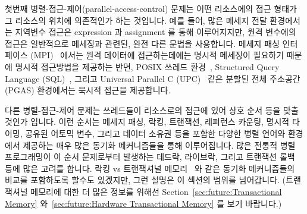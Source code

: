 첫번째 병렬-접근-제어(parallel-access-control) 문제는 어떤 리소스에의 접근
형태가 그 리소스의 위치에 의존적인가 하는 것입니다.
예를 들어, 많은 메세지 전달 환경에서는 지역변수 접근은 expression 과 assignment
를 통해 이루어지지만, 원격 변수에의 접근은 일반적으로 메세징과 관련된, 완전
다른 문법을 사용합니다.
메세지 패싱 인터페이스 (MPI)~\cite{MPIForum2008} 에서는 원격 데이터에
접근하는데에는 명시적 메세징이 필요하기 때문에 명시적 접근방법을 제공하는 반면,
POSIX 쓰레드 환경~\cite{OpenGroup1997pthreads}, Structured Query Language
(SQL)~\cite{DIS9075SQL92}, 그리고 Universal Parallel C
(UPC)~\cite{ElGhazawi2003UPC} 같은 분할된 전체 주소공간(PGAS) 환경에서는 묵시적
접근을 제공합니다.

다른 병렬-접근-제어 문제는 쓰레드들이 리소스로의 접근에 있어 상호 순서 등을
맞출 것인가 입니다.
이런 순서는 메세지 패싱, 락킹, 트랜잭션, 레퍼런스 카운팅, 명시적 타이밍, 공유된
어토믹 변수, 그리고 데이터 소유권 등을 포함한 다양한 병렬 언어와 환경에서
제공하는 매우 많은 동기화 메커니즘들을 통해 이루어집니다.
많은 전통적 병렬 프로그래밍이 이 순서 문제로부터 발생하는 데드락, 라이브락,
그리고 트랜잭션 롤백 등에 많은 고려를 합니다.
락킹 vs 트랜잭셔널 메모리~\cite{McKenney2007PLOSTM} 와 같은 동기화 메커니즘들의
비교를 포함하도록 할수도 있겠지만, 그런 설명은 이 섹션의 범위를 넘어갑니다.
(트랜잭셔널 메모리에 대한 더 많은 정보를 위해선
Section~\ref{sec:future:Transactional Memory} 와~\ref{sec:future:Hardware
Transactional Memory} 를 보기 바랍니다.)

